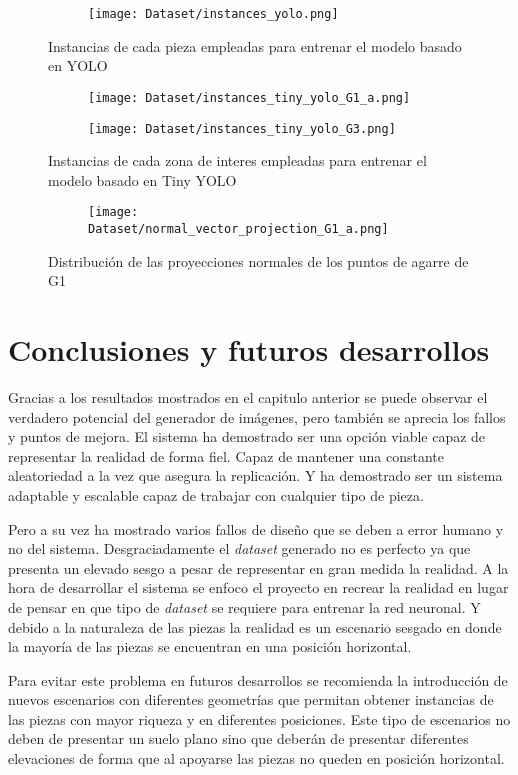 \begin{figure}[ht]
	\ContinuedFloat
	\centering
	\begin{subfigure}[b]{0.9\linewidth}
		\texttt{[image: Dataset/instances\_yolo.png]}
	\end{subfigure}
	\caption{Instancias de cada pieza empleadas para entrenar el modelo basado en YOLO}
	\label{chap:Generación de un dataset fig:Instancias YOLO}
	
	\begin{subfigure}[b]{0.4\linewidth}
		\texttt{[image: Dataset/instances\_tiny\_yolo\_G1\_a.png]}
	\end{subfigure}
	\begin{subfigure}[b]{0.4\linewidth}
		\texttt{[image: Dataset/instances\_tiny\_yolo\_G3.png]}
	\end{subfigure}
	\caption{Instancias de cada zona de interes empleadas para entrenar el modelo basado en Tiny YOLO}
	\label{chap:Generación de un dataset fig:Instancias Tiny YOLO}
	
	\begin{subfigure}[b]{0.9\linewidth}
		\texttt{[image: Dataset/normal\_vector\_projection\_G1\_a.png]}
	\end{subfigure}
	\caption{Distribución de las proyecciones normales de los puntos de agarre de G1}
	\label{chap:Generación de un dataset fig:Sesgo G1}

\end{figure}


\section{Conclusiones y futuros desarrollos}
Gracias a los resultados mostrados en el capitulo anterior se puede observar el verdadero potencial del generador de imágenes, pero también se aprecia los fallos y puntos de mejora. El sistema ha demostrado ser una opción viable capaz de representar la realidad de forma fiel. Capaz de mantener una constante aleatoriedad a la vez que asegura la replicación. Y ha demostrado ser un sistema adaptable y escalable capaz de trabajar con cualquier tipo de pieza.

Pero a su vez ha mostrado varios fallos de diseño que se deben a error humano y no del sistema. Desgraciadamente el \textit{dataset} generado no es perfecto ya que presenta un elevado sesgo a pesar de representar en gran medida la realidad. A la hora de desarrollar el sistema se enfoco el proyecto en recrear la realidad en lugar de pensar en que tipo de \textit{dataset} se requiere para entrenar la red neuronal. Y debido a la naturaleza de las piezas la realidad es un escenario sesgado en donde la mayoría de las piezas se encuentran en una posición horizontal.

Para evitar este problema en futuros desarrollos se recomienda la introducción de nuevos escenarios con diferentes geometrías que permitan obtener instancias de las piezas con mayor riqueza y en diferentes posiciones. Este tipo de escenarios no deben de presentar un suelo plano sino que deberán de presentar diferentes elevaciones de forma que al apoyarse las piezas no queden en posición horizontal.

